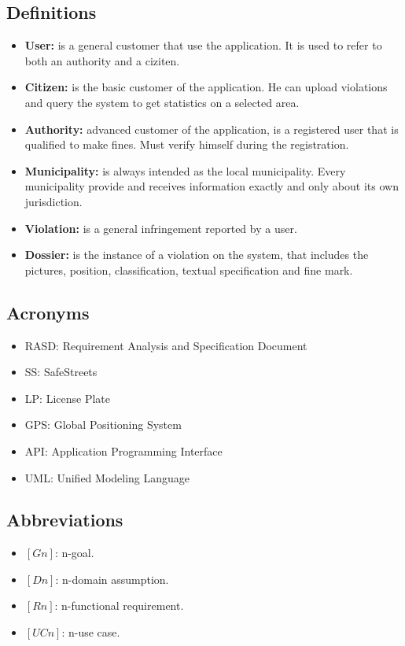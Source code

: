 \documentclass[../RASD.tex]{subfiles}
\begin{document}
        \subsection{Definitions}\label{subsec:definitions}
        \begin{itemize}
            \item \textbf{User:} is a general customer that use the application. It is used to refer to both an authority and a ciziten.
            \item \textbf{Citizen:} is the basic customer of the application. He can upload violations and query the system to get statistics on a selected area.
            \item \textbf{Authority:} advanced customer of the application, is a registered user that is qualified to make fines. Must verify himself during the registration.
            \item \textbf{Municipality:} is always intended as the local municipality. Every municipality provide and receives information exactly and only about its own jurisdiction.
            \item \textbf{Violation:} is a general infringement reported by a user.
            \item  \textbf{Dossier:} is the instance of a violation on the system, that includes the pictures, position, classification, textual specification and fine mark.
        \end{itemize}

        \subsection{Acronyms}\label{subsec:acronyms}
        \begin{itemize}
            \item RASD: Requirement Analysis and Specification Document
            \item SS: SafeStreets
            \item LP: License Plate
            \item GPS: Global Positioning System
            \item API: Application Programming Interface
            \item UML: Unified Modeling Language
        \end{itemize}

        \subsection{Abbreviations}\label{subsec:abbreviations}
        \begin{itemize}
            \item $[Gn]$: n-goal.
            \item $[Dn]$: n-domain assumption.
            \item $[Rn]$: n-functional requirement.
            \item $[UCn]$: n-use case.
        \end{itemize}
\end{document}
